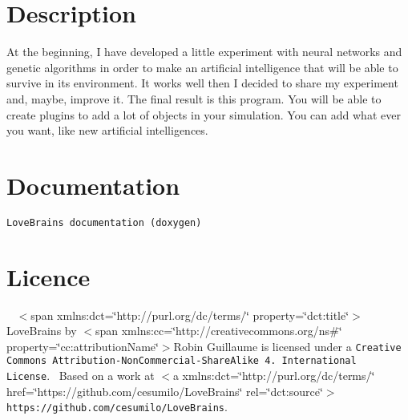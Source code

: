 \section*{Description}

At the beginning, I have developed a little experiment with neural networks and genetic algorithms in order to make an artificial intelligence that will be able to survive in its environment. It works well then I decided to share my experiment and, maybe, improve it. The final result is this program. You will be able to create plugins to add a lot of objects in your simulation. You can add what ever you want, like new artificial intelligences.

\section*{Documentation}

{\tt Love\+Brains documentation (doxygen)}

\section*{Licence}

{\tt }~\newline
$<$span xmlns\+:dct=\char`\"{}http\+://purl.\+org/dc/terms/\char`\"{} property=\char`\"{}dct\+:title\char`\"{}$>$Love\+Brains by $<$span xmlns\+:cc=\char`\"{}http\+://creativecommons.\+org/ns\#\char`\"{} property=\char`\"{}cc\+:attribution\+Name\char`\"{}$>$Robin Guillaume is licensed under a {\tt Creative Commons Attribution-\/\+Non\+Commercial-\/\+Share\+Alike 4. International License}.~\newline
Based on a work at $<$a xmlns\+:dct=\char`\"{}http\+://purl.\+org/dc/terms/\char`\"{} href=\char`\"{}https\+://github.\+com/cesumilo/\+Love\+Brains\char`\"{} rel=\char`\"{}dct\+:source\char`\"{}$>${\tt https\+://github.\+com/cesumilo/\+Love\+Brains}. 